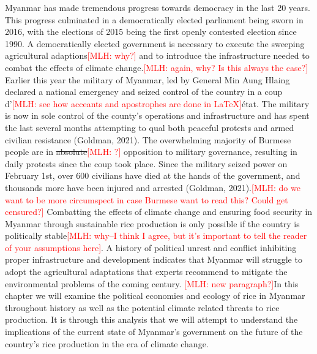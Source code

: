 \documentclass{book}\usepackage{knitr}
\newcommand{\red}[1]{\textcolor{red}{[MLH: #1]}}
\begin{document}
\begin{knitrout}
\begin{kframe}
{Myanmar has made tremendous progress towards democracy in the last 20 years. This progress culminated in a democratically elected parliament being sworn in 2016, with the elections of 2015 being the first openly contested election since 1990. A democratically elected government is necessary to execute the sweeping agricultural adaptions\red{why?} and to introduce the infrastructure needed to combat the effects of climate change.\red{again, why? Is this always the case?} Earlier this year the military of Myanmar, led by General Min Aung Hlaing declared a national emergency and seized control of the country in a coup d’\red{see how acceants and apostrophes are done in \LaTeX}état. The military is now in sole control of the county’s operations and infrastructure and has spent the last several months attempting to qual both peaceful protests and armed civilian resistance (Goldman, 2021). The overwhelming majority of Burmese people are in \st{absolute}\red{?} opposition to military governance, resulting in daily protests since the coup took place. Since the military seized power on February 1st, over 600 civilians have died at the hands of the government, and thousands more have been injured and arrested (Goldman, 2021).\red{do we want to be more circumspect in case Burmese want to read this?  Could get censured?} 
Combatting the effects of climate change and ensuring food security in Myanmar through sustainable rice production is only possible if the country is politically stable\red{why--I think I agree, but it's important to tell the reader of your assumptions here}. A history of political unrest and conflict inhibiting proper infrastructure and development indicates that Myanmar will struggle to adopt the agricultural adaptations that experts recommend to mitigate the environmental problems of the coming century. \red{new paragraph?}In this chapter we will examine the political economies and ecology of rice in Myanmar throughout history as well as the potential climate related threats to rice production. It is through this analysis that we will attempt to understand the implications of the current state of Myanmar’s government on the future of the country’s rice production in the era of climate change. 

}
\end{kframe}
\end{knitrout}
\end{document}
